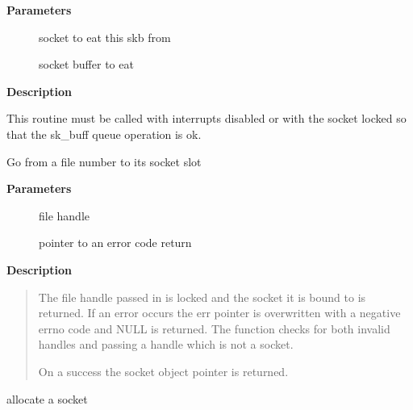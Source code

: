 \documentclass[a4paper,8pt,english]{sphinxmanual}
\begin{document}
\textbf{Parameters}
\begin{description}
\item[{}] \leavevmode
socket to eat this skb from

\item[{}] \leavevmode
socket buffer to eat

\end{description}

\textbf{Description}

This routine must be called with interrupts disabled or with the socket
locked so that the sk\_buff queue operation is ok.

\begin{fulllineitems}
\label{networking/kapi:c.sockfd_lookup}
Go from a file number to its socket slot

\end{fulllineitems}


\textbf{Parameters}
\begin{description}
\item[{}] \leavevmode
file handle

\item[{}] \leavevmode
pointer to an error code return

\end{description}

\textbf{Description}
\begin{quote}

The file handle passed in is locked and the socket it is bound
to is returned. If an error occurs the err pointer is overwritten
with a negative errno code and NULL is returned. The function checks
for both invalid handles and passing a handle which is not a socket.

On a success the socket object pointer is returned.
\end{quote}

\begin{fulllineitems}
\label{networking/kapi:c.sock_alloc}
allocate a socket

\end{fulllineitems}
\end{document}
